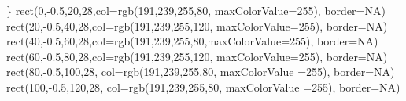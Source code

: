 \documentclass[
]{book}
\newenvironment{Shaded}{\begin{snugshade}}{\end{snugshade}}
\newcommand{\AttributeTok}[1]{\textcolor[rgb]{0.77,0.63,0.00}{#1}}
\newcommand{\ConstantTok}[1]{\textcolor[rgb]{0.00,0.00,0.00}{#1}}
\newcommand{\DecValTok}[1]{\textcolor[rgb]{0.00,0.00,0.81}{#1}}
\newcommand{\FloatTok}[1]{\textcolor[rgb]{0.00,0.00,0.81}{#1}}
\newcommand{\FunctionTok}[1]{\textcolor[rgb]{0.00,0.00,0.00}{#1}}
\newcommand{\NormalTok}[1]{#1}
\newcommand{\SpecialCharTok}[1]{\textcolor[rgb]{0.00,0.00,0.00}{#1}}
\begin{document}
\begin{Shaded}
\begin{Highlighting}[]
\NormalTok{\}}
\FunctionTok{rect}\NormalTok{(}\DecValTok{0}\NormalTok{,}\SpecialCharTok{{-}}\FloatTok{0.5}\NormalTok{,}\DecValTok{20}\NormalTok{,}\DecValTok{28}\NormalTok{,}\AttributeTok{col=}\FunctionTok{rgb}\NormalTok{(}\DecValTok{191}\NormalTok{,}\DecValTok{239}\NormalTok{,}\DecValTok{255}\NormalTok{,}\DecValTok{80}\NormalTok{, }\AttributeTok{maxColorValue=}\DecValTok{255}\NormalTok{), }\AttributeTok{border=}\ConstantTok{NA}\NormalTok{)}
\FunctionTok{rect}\NormalTok{(}\DecValTok{20}\NormalTok{,}\SpecialCharTok{{-}}\FloatTok{0.5}\NormalTok{,}\DecValTok{40}\NormalTok{,}\DecValTok{28}\NormalTok{,}\AttributeTok{col=}\FunctionTok{rgb}\NormalTok{(}\DecValTok{191}\NormalTok{,}\DecValTok{239}\NormalTok{,}\DecValTok{255}\NormalTok{,}\DecValTok{120}\NormalTok{, }\AttributeTok{maxColorValue=}\DecValTok{255}\NormalTok{), }\AttributeTok{border=}\ConstantTok{NA}\NormalTok{)}
\FunctionTok{rect}\NormalTok{(}\DecValTok{40}\NormalTok{,}\SpecialCharTok{{-}}\FloatTok{0.5}\NormalTok{,}\DecValTok{60}\NormalTok{,}\DecValTok{28}\NormalTok{,}\AttributeTok{col=}\FunctionTok{rgb}\NormalTok{(}\DecValTok{191}\NormalTok{,}\DecValTok{239}\NormalTok{,}\DecValTok{255}\NormalTok{,}\DecValTok{80}\NormalTok{,}\AttributeTok{maxColorValue=}\DecValTok{255}\NormalTok{), }\AttributeTok{border=}\ConstantTok{NA}\NormalTok{)}
\FunctionTok{rect}\NormalTok{(}\DecValTok{60}\NormalTok{,}\SpecialCharTok{{-}}\FloatTok{0.5}\NormalTok{,}\DecValTok{80}\NormalTok{,}\DecValTok{28}\NormalTok{,}\AttributeTok{col=}\FunctionTok{rgb}\NormalTok{(}\DecValTok{191}\NormalTok{,}\DecValTok{239}\NormalTok{,}\DecValTok{255}\NormalTok{,}\DecValTok{120}\NormalTok{, }\AttributeTok{maxColorValue=}\DecValTok{255}\NormalTok{), }\AttributeTok{border=}\ConstantTok{NA}\NormalTok{)}
\FunctionTok{rect}\NormalTok{(}\DecValTok{80}\NormalTok{,}\SpecialCharTok{{-}}\FloatTok{0.5}\NormalTok{,}\DecValTok{100}\NormalTok{,}\DecValTok{28}\NormalTok{, }\AttributeTok{col=}\FunctionTok{rgb}\NormalTok{(}\DecValTok{191}\NormalTok{,}\DecValTok{239}\NormalTok{,}\DecValTok{255}\NormalTok{,}\DecValTok{80}\NormalTok{, }\AttributeTok{maxColorValue =}\DecValTok{255}\NormalTok{), }\AttributeTok{border=}\ConstantTok{NA}\NormalTok{)}
\FunctionTok{rect}\NormalTok{(}\DecValTok{100}\NormalTok{,}\SpecialCharTok{{-}}\FloatTok{0.5}\NormalTok{,}\DecValTok{120}\NormalTok{,}\DecValTok{28}\NormalTok{, }\AttributeTok{col=}\FunctionTok{rgb}\NormalTok{(}\DecValTok{191}\NormalTok{,}\DecValTok{239}\NormalTok{,}\DecValTok{255}\NormalTok{,}\DecValTok{80}\NormalTok{, }\AttributeTok{maxColorValue =}\DecValTok{255}\NormalTok{), }\AttributeTok{border=}\ConstantTok{NA}\NormalTok{)}


\end{Highlighting}
\end{Shaded}
\end{document}

